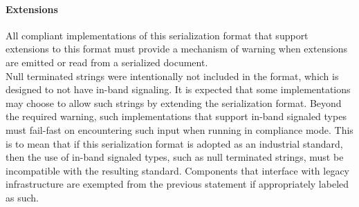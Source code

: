 \paragraph{Extensions}
All compliant implementations of this serialization format that support extensions to this format must provide a mechanism of warning when extensions are emitted or read from a serialized document.\\
Null terminated strings were intentionally not included in the format, which is designed to not have in-band signaling. It is expected that some implementations may choose to allow such strings by extending the serialization format. Beyond the required warning, such implementations that support in-band signaled types must fail-fast on encountering such input when running in compliance mode. This is to mean that if this serialization format is adopted as an industrial standard, then the use of in-band signaled types, such as null terminated strings, must be incompatible with the resulting standard. Components that interface with legacy infrastructure are exempted from the previous statement if appropriately labeled as such.